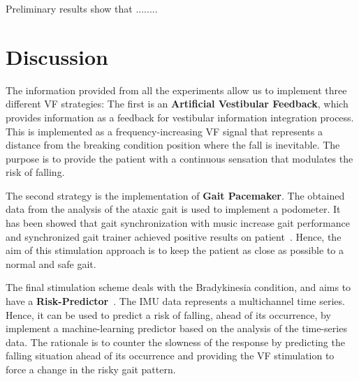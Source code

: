 \documentclass[conference]{IEEEtran}
\begin{document}
Preliminary results show that ........

%
%
%

\section*{Discussion}

The information provided from all the experiments allow us to implement three different VF strategies:  The first is an \textbf{Artificial Vestibular Feedback}, which provides information as a feedback for vestibular information integration process.  This is implemented as a frequency-increasing VF signal that represents a distance from the breaking condition position where the fall is inevitable.   The purpose is to provide the patient with a continuous sensation that modulates the risk of falling.

The second strategy is the implementation of \textbf{Gait Pacemaker}.  The obtained data from the analysis of the ataxic gait is used to implement a podometer.  It has been showed that gait synchronization with music increase gait performance~\cite{Roerdink.etal2007} and synchronized gait trainer achieved positive results on patient~\cite{Blicher.etal2009}.  Hence, the aim of this stimulation approach is to keep the patient as close as possible to a normal and safe gait.

The final stimulation scheme deals with the Bradykinesia condition, and aims to have a \textbf{Risk-Predictor}~\cite{Rahman.etal2022,Ali.etal2022}.  The IMU data  represents a multichannel time series.  Hence, it can be used to predict a risk of falling, ahead of its occurrence, by implement a machine-learning predictor based on the analysis of the time-series data.  The rationale is to counter the slowness of the response by predicting the falling situation ahead of its occurrence and providing the VF stimulation to force a change in the risky gait pattern.
\end{document}
